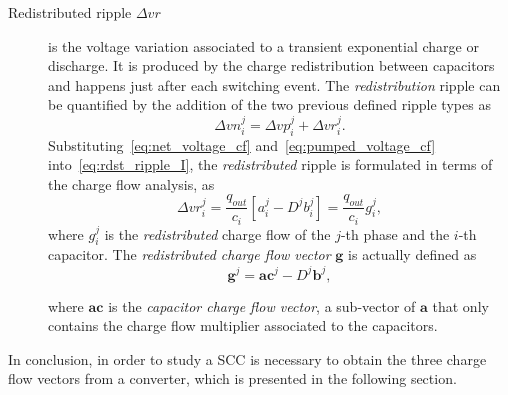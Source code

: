\begin{description}
  \item[Redistributed ripple $\Delta vr$ ]is the voltage variation associated to a transient exponential charge or discharge. It is produced by the charge redistribution between capacitors and happens just after each switching event. The \emph{redistribution} ripple can be quantified by the addition of the two previous defined ripple types as
      \begin{equation}
        \Delta {vn}^j_i  = \Delta {vp}^j_i + \Delta {vr}^j_i .
      \label{eq:rdst_ripple_I}
      \end{equation}
      Substituting~\eqref{eq:net_voltage_cf} and~\eqref{eq:pumped_voltage_cf} into~\eqref{eq:rdst_ripple_I}, the \emph{redistributed} ripple is formulated in terms of the charge flow analysis, as
      \begin{equation}
        \Delta {vr}^j_i  = \frac{q_{out}}{c_i} \left[ a^j_i - D^j b^j_i \right] = \frac{q_{out}}{c_i} g^j_i,
      \label{eq:rdst_ripple_II}
      \end{equation}
      where $g^j_i$ is the \emph{redistributed} charge flow of the $j$-th phase and the $i$-th capacitor. The \emph{redistributed charge flow vector} $\mathbf{g}$ is actually defined as
      \begin{equation}
        \mathbf{g}^j   = \mathbf{ac}^j - D^j \mathbf{b}^j,
      \label{eq:rdst_chrg_flow}
      \end{equation}

      where $\mathbf{ac}$ is the \emph{capacitor charge flow vector}, a sub-vector of $\mathbf{a}$ that only contains the charge flow multiplier associated to the capacitors.
\end{description}
In conclusion, in order to study a SCC is necessary to obtain the three charge flow vectors from a converter, which is presented in the following section.

